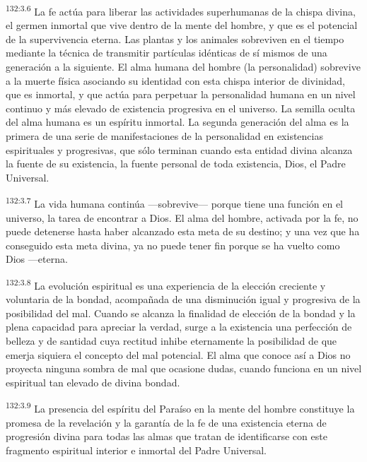 \par 
\textsuperscript{132:3.6} La fe actúa para liberar las actividades superhumanas de la chispa divina, el germen inmortal que vive dentro de la mente del hombre, y que es el potencial de la supervivencia eterna. Las plantas y los animales sobreviven en el tiempo mediante la técnica de transmitir partículas idénticas de sí mismos de una generación a la siguiente. El alma humana del hombre (la personalidad) sobrevive a la muerte física asociando su identidad con esta chispa interior de divinidad, que es inmortal, y que actúa para perpetuar la personalidad humana en un nivel continuo y más elevado de existencia progresiva en el universo. La semilla oculta del alma humana es un espíritu inmortal. La segunda generación del alma es la primera de una serie de manifestaciones de la personalidad en existencias espirituales y progresivas, que sólo terminan cuando esta entidad divina alcanza la fuente de su existencia, la fuente personal de toda existencia, Dios, el Padre Universal.

\par 
\textsuperscript{132:3.7} La vida humana continúa ---sobrevive--- porque tiene una función en el universo, la tarea de encontrar a Dios. El alma del hombre, activada por la fe, no puede detenerse hasta haber alcanzado esta meta de su destino; y una vez que ha conseguido esta meta divina, ya no puede tener fin porque se ha vuelto como Dios ---eterna.

\par 
\textsuperscript{132:3.8} La evolución espiritual es una experiencia de la elección creciente y voluntaria de la bondad, acompañada de una disminución igual y progresiva de la posibilidad del mal. Cuando se alcanza la finalidad de elección de la bondad y la plena capacidad para apreciar la verdad, surge a la existencia una perfección de belleza y de santidad cuya rectitud inhibe eternamente la posibilidad de que emerja siquiera el concepto del mal potencial. El alma que conoce así a Dios no proyecta ninguna sombra de mal que ocasione dudas, cuando funciona en un nivel espiritual tan elevado de divina bondad.

\par 
\textsuperscript{132:3.9} La presencia del espíritu del Paraíso en la mente del hombre constituye la promesa de la revelación y la garantía de la fe de una existencia eterna de progresión divina para todas las almas que tratan de identificarse con este fragmento espiritual interior e inmortal del Padre Universal.

